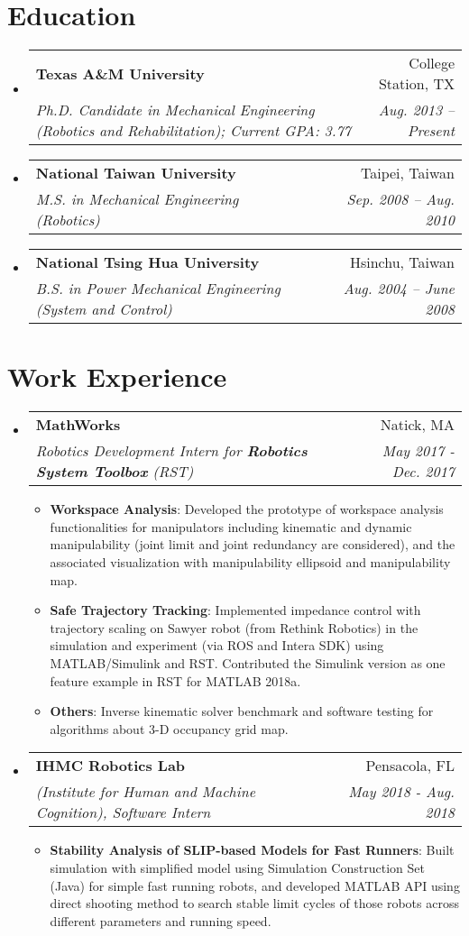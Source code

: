 \documentclass[letterpaper,11pt]{article}
\makeatletter
\newcommand{\resumeItem}[2]{
  \item\small{
    \textbf{#1}{: #2 \vspace{-2pt}}
  }
}
\newcommand{\resumeSubheading}[4]{
  \vspace{-1pt}\item
    \begin{tabular*}{0.97\textwidth}{l@{\extracolsep{\fill}}r}
      \textbf{#1} & #2 \\
      \textit{\small#3} & \textit{\small #4} \\
    \end{tabular*}\vspace{-5pt}
}
\newcommand{\resumeSubHeadingListStart}{\begin{itemize}[leftmargin=*]}
\newcommand{\resumeSubHeadingListEnd}{\end{itemize}}
\newcommand{\resumeItemListStart}{\begin{itemize}}
\newcommand{\resumeItemListEnd}{\end{itemize}\vspace{-5pt}}
\makeatother
\begin{document}
\section{Education}
  \resumeSubHeadingListStart
    \resumeSubheading
      {Texas A\&M University}{College Station, TX}
      {Ph.D. Candidate in {Mechanical Engineering (Robotics and Rehabilitation)};  Current GPA: 3.77}{Aug. 2013 -- Present}
    \resumeSubheading
      {National Taiwan University}{Taipei, Taiwan}
      {M.S. in {Mechanical Engineering (Robotics)}     }{Sep. 2008 -- Aug. 2010}
    \resumeSubheading
      {National Tsing Hua University}{Hsinchu, Taiwan}
      {B.S. in {Power Mechanical Engineering (System and Control)}     }{Aug. 2004 -- June 2008}      
  \resumeSubHeadingListEnd
  

\section{Work Experience}
  \resumeSubHeadingListStart

    \resumeSubheading
      {MathWorks}{Natick, MA}
      {Robotics Development Intern for \textbf{Robotics System Toolbox} (RST)}{May 2017 - Dec. 2017}
      \resumeItemListStart
        \resumeItem{Workspace Analysis}
          {Developed the prototype of workspace analysis functionalities for manipulators including kinematic and dynamic manipulability (joint limit and joint redundancy are considered), and the associated visualization with manipulability ellipsoid and manipulability map.}
        \resumeItem{Safe Trajectory Tracking}
          {Implemented impedance control with trajectory scaling on Sawyer robot (from Rethink Robotics) in the simulation and experiment (via ROS and Intera SDK) using MATLAB/Simulink and RST. Contributed the Simulink version as one feature example in RST for MATLAB 2018a.}
        \resumeItem{Others}
          {Inverse kinematic solver benchmark and software testing for algorithms about 3-D occupancy grid map.}      
      \resumeItemListEnd
          \resumeSubheading
          {IHMC Robotics Lab}{{Pensacola}, FL}
          {(Institute for Human and Machine Cognition), Software Intern}{May 2018 - Aug. 2018}
          \resumeItemListStart
          \resumeItem{Stability Analysis of SLIP-based Models for Fast Runners}
          {Built simulation with simplified model using Simulation Construction Set (Java) for simple fast running robots, and developed MATLAB API using direct shooting method to search stable limit cycles of those robots across different parameters and running speed.}
          \resumeItemListEnd
  \resumeSubHeadingListEnd
\end{document}
